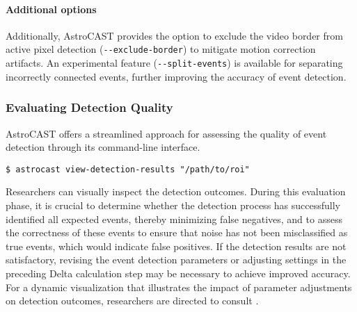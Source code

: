 \paragraph{Additional options}
Additionally, AstroCAST provides the option to exclude the video border from active pixel detection (\lstinline[style=bashStyle]{--exclude-border}) to mitigate motion correction artifacts. An experimental feature (\lstinline[style=bashStyle]{--split-events}) is available for separating incorrectly connected events, further improving the accuracy of event detection.


\subsubsection{Evaluating Detection Quality}
AstroCAST offers a streamlined approach for assessing the quality of event detection through its command-line interface.

\begin{lstlisting}[style=bashStyle]
    $ astrocast view-detection-results "/path/to/roi"
\end{lstlisting}

Researchers can visually inspect the detection outcomes. During this evaluation phase, it is crucial to determine
whether the detection process has successfully identified all expected events, thereby minimizing false negatives,
and to assess the correctness of these events to ensure that noise has not been misclassified as true events, which
would indicate false positives. If the detection results are not satisfactory, revising the event detection
parameters or adjusting settings in the preceding Delta calculation step may be necessary to achieve improved
accuracy. For a dynamic visualization that illustrates the impact of parameter adjustments on detection outcomes,
researchers are directed to consult .
